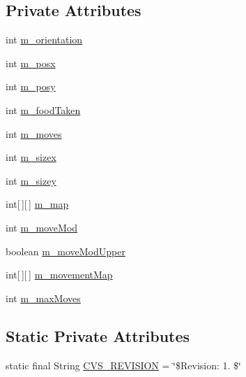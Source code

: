 \subsection*{Private Attributes}
\begin{DoxyCompactItemize}
\item 
int \hyperlink{classexamples_1_1gp_1_1anttrail_1_1_ant_map_acbb73a15f0ac5587a9b0699214336fe4}{m\-\_\-orientation}
\item 
int \hyperlink{classexamples_1_1gp_1_1anttrail_1_1_ant_map_a78bbd25205b3dbd31d534b48305479fc}{m\-\_\-posx}
\item 
int \hyperlink{classexamples_1_1gp_1_1anttrail_1_1_ant_map_aeb439139e9d4dc14ae7c1717ae2a168c}{m\-\_\-posy}
\item 
int \hyperlink{classexamples_1_1gp_1_1anttrail_1_1_ant_map_aa2c81b0a2aeb5f8e3429221c257d368b}{m\-\_\-food\-Taken}
\item 
int \hyperlink{classexamples_1_1gp_1_1anttrail_1_1_ant_map_a718e60059c6e78690ffccd148264726b}{m\-\_\-moves}
\item 
int \hyperlink{classexamples_1_1gp_1_1anttrail_1_1_ant_map_aa00ab3faf14fb86d7527f4a29f13b991}{m\-\_\-sizex}
\item 
int \hyperlink{classexamples_1_1gp_1_1anttrail_1_1_ant_map_a008362c5dd5918e4717d29e16d8f6d9a}{m\-\_\-sizey}
\item 
int\mbox{[}$\,$\mbox{]}\mbox{[}$\,$\mbox{]} \hyperlink{classexamples_1_1gp_1_1anttrail_1_1_ant_map_a35615fc03c2049d64f24775e5600c88a}{m\-\_\-map}
\item 
int \hyperlink{classexamples_1_1gp_1_1anttrail_1_1_ant_map_a5775cffaa10d0b03112296a1f9394d5d}{m\-\_\-move\-Mod}
\item 
boolean \hyperlink{classexamples_1_1gp_1_1anttrail_1_1_ant_map_ad6f8fd4fb0a5468172d43ea23f40f9c0}{m\-\_\-move\-Mod\-Upper}
\item 
int\mbox{[}$\,$\mbox{]}\mbox{[}$\,$\mbox{]} \hyperlink{classexamples_1_1gp_1_1anttrail_1_1_ant_map_a1b9b0d79c9d7638122ad5c56cb48b9fe}{m\-\_\-movement\-Map}
\item 
int \hyperlink{classexamples_1_1gp_1_1anttrail_1_1_ant_map_a44eed38784d41f1d2296a7055ddde1b6}{m\-\_\-max\-Moves}
\end{DoxyCompactItemize}
\subsection*{Static Private Attributes}
\begin{DoxyCompactItemize}
\item 
static final String \hyperlink{classexamples_1_1gp_1_1anttrail_1_1_ant_map_a8b73287edca9a18868ff1b89ccb39843}{C\-V\-S\-\_\-\-R\-E\-V\-I\-S\-I\-O\-N} = \char`\"{}\$Revision\-: 1. \$\char`\"{}
\end{DoxyCompactItemize}


